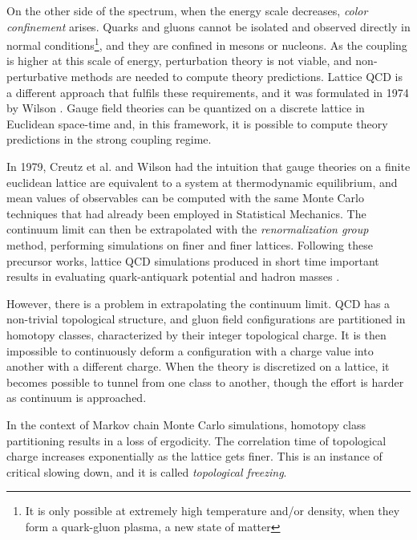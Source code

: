 On the other side of the spectrum, when the energy scale decreases, \emph{color confinement} arises.
Quarks and gluons cannot be isolated and observed directly in normal conditions\footnote{It is only possible at extremely high temperature and/or density, when they form a quark-gluon plasma, a new state of matter},
and they are confined in mesons or nucleons.
As the coupling is higher at this scale of energy, perturbation theory is not viable, and non-perturbative methods are needed to compute theory predictions.
Lattice QCD is a different approach that fulfils these requirements, and it was formulated in 1974 by Wilson \cite{wilson:1974}.
Gauge field theories can be quantized on a discrete lattice in Euclidean space-time and,
in this framework, it is possible to compute theory predictions in the strong coupling regime.

In 1979, Creutz et al.\@ \cite{creutz:1979} and Wilson \cite{wilson:1980}
had the intuition that gauge theories on a finite euclidean lattice are equivalent to a system at thermodynamic equilibrium,
and mean values of observables can be computed with the same Monte Carlo techniques that had already been employed in Statistical Mechanics.
The continuum limit can then be extrapolated with the \emph{renormalization group} method, performing simulations on finer and finer lattices.
Following these precursor works, lattice QCD simulations produced in short time important results in evaluating quark-antiquark potential and hadron masses
\cite{creutz:1980, hamber-parisi:1981, weingarten:1982}.

However, there is a problem in extrapolating the continuum limit.
QCD has a non-trivial topological structure, and gluon field configurations are partitioned in homotopy classes, characterized by their integer topological charge.
It is then impossible to continuously deform a configuration with a charge value into another with a different charge.
When the theory is discretized on a lattice, it becomes possible to tunnel from one class to another,
though the effort is harder as continuum is approached.

In the context of Markov chain Monte Carlo simulations, homotopy class partitioning results in a loss of ergodicity.
The correlation time of topological charge increases exponentially as the lattice gets finer.
This is an instance of critical slowing down, and it is called \emph{topological freezing}.

